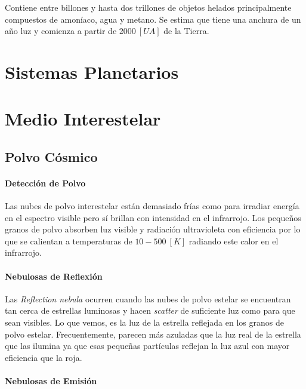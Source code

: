 \documentclass{tufte-handout}
\begin{document}
Contiene entre billones y hasta dos trillones de objetos helados principalmente compuestos de amoníaco, agua y metano. Se estima que tiene una anchura de un año luz y comienza a partir de $2000~[UA]$ de la Tierra.

\clearpage

\section{Sistemas Planetarios}

\clearpage

\section{Medio Interestelar}

\subsection{Polvo Cósmico}

\paragraph{Detección de Polvo}

Las nubes de polvo interestelar están demasiado frías como para irradiar energía en el espectro visible pero sí brillan con intensidad en el infrarrojo. Los pequeños granos de polvo absorben luz visible y radiación ultravioleta con eficiencia por lo que se calientan a temperaturas de $10-500~[K]$ radiando este calor en el infrarrojo.

\paragraph{Nebulosas de Reflexión}

Las \emph{Reflection nebula} ocurren cuando las nubes de polvo estelar se encuentran tan cerca de estrellas luminosas y hacen \emph{scatter} de suficiente luz como para que sean visibles. Lo que vemos, es la luz de la estrella reflejada en los granos de polvo estelar. Frecuentemente, parecen más azuladas que la luz real de la estrella que las ilumina ya que esas pequeñas partículas reflejan la luz azul con mayor eficiencia que la roja.

\paragraph{Nebulosas de Emisión}
\end{document}
